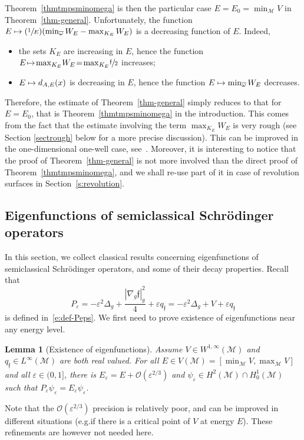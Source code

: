 \documentclass[10pt]{amsart}
\newcommand\mto{\mathchoice{\longmapsto}{\mapsto}{\mapsto}{\mapsto}}
\newcommand{\Psfrac}[2]{(\sfrac{#1}{#2})}
\newtheorem{lemma}{Lemma}[section]
\theoremstyle{definition}
\newcommand{\M}{\ensuremath{\mathcal M}}
\newcommand\grando[1]{\mathcal{O}\left(#1\right)}
\newcommand{\f}{\ensuremath{\mathfrak{f}}}
\newcommand\Lap{\Delta_{g}}
\newcommand\nablag{\nabla_{g}}
\let\eps\varepsilon
\let\ovl\overline
\newcommand{\qf}{q_{\f}}
\providecommand{\eg}{e.g.}\providecommand{\ie}{i.e.}\providecommand{\etc}{etc.}
\begin{document}
Theorem~\ref{thmtmpsminomega} is then the particular case $E=E_0=\min_\M V$ in Theorem~\ref{thm-general}.
Unfortunately, the function $E \mto \Psfrac{1}{E}(\min_{\ovl{\omega}}W_E - \max_{K_E} W_E)$ is a decreasing function of $E$. Indeed,
\begin{itemize}
\item the sets $K_E$ are increasing in $E$, hence the function $E\!\mto\! \max_{K_E} \!W_E\!=\! \max_{K_E} \!\sfrac{\f}{2}$ increases;
\item $E \mto d_{A,E}(x)$ is decreasing in $E$, hence the function $E \mto\min_{\ovl{\omega}}W_E$ decreases.
\end{itemize}
Therefore, the estimate of Theorem~\ref{thm-general} simply reduces to that for $E=E_0$, that is Theorem~\ref{thmtmpsminomega} in the introduction.
This comes from the fact that the estimate involving the term $\max_{K_E} W_E$ is very rough (see Section \ref{sectrough} below for a more precise discussion). This can be improved in the one-dimensional one-well case, see~\cite{LL:20-1D}.
Moreover, it is interesting to notice that the proof of Theorem~\ref{thm-general} is not more involved than the direct proof of Theorem~\ref{thmtmpsminomega}, and we shall re-use part of it in case of revolution surfaces in Section~\ref{s:revolution}.

\subsection{Eigenfunctions of semiclassical Schrödinger operators}
\label{s:sub-eig-schro}
In this section, we collect classical results concerning eigenfunctions of semiclassical Schrödinger operators, and some of their decay properties.
Recall that
\[
P_\eps = - \eps^2 \Lap + \frac{|\nablag \f|_g^2}{4} + \eps \qf = - \eps^2 \Lap + V+ \eps \qf
\]
is defined in~\eqref{e:def-Peps}.
We first need to prove existence of eigenfunctions near any energy level.
\begin{lemma}[Existence of eigenfunctions]
\label{l:exist-eig}
Assume $V \in W^{1,\infty}(\M)$ and $\qf \in L^\infty(\M)$ are both real valued.
For all $E \in V(\M) = [\min_\M V, \max_\M V]$ and all $\eps \in (0,1]$, there is $E_\eps = E + \grando{\eps^{2/3}}$ and $\psi_\eps \in H^2(\M) \cap H^1_0(\M)$ such that $P_\eps \psi_\eps = E_\eps \psi_\eps$.
\end{lemma}
Note that the $\grando{\eps^{2/3}}$ precision is relatively poor, and can be improved in different situations (\eg if there is a critical point of $V$ at energy $E$). These refinements are however not needed here.
\end{document}
